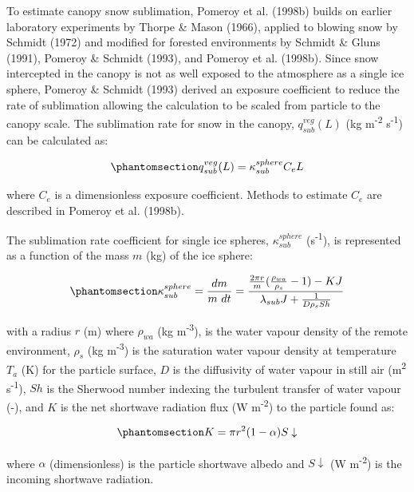\documentclass[
  letterpaper,
]{tex/uofsthesis-cs}
\begin{document}
To estimate canopy snow sublimation, Pomeroy et al. (1998b) builds on
earlier laboratory experiments by Thorpe \& Mason (1966), applied to
blowing snow by Schmidt (1972) and modified for forested environments by
Schmidt \& Gluns (1991), Pomeroy \& Schmidt (1993), and Pomeroy et al.
(1998b). Since snow intercepted in the canopy is not as well exposed to
the atmosphere as a single ice sphere, Pomeroy \& Schmidt (1993) derived
an exposure coefficient to reduce the rate of sublimation allowing the
calculation to be scaled from particle to the canopy scale. The
sublimation rate for snow in the canopy, \(q_{sub}^{veg}(L)\) (kg
m\textsuperscript{-2} s\textsuperscript{-1}) can be calculated as:

\begin{equation}\phantomsection\label{eq-pom98-v_i}{
q_{sub}^{veg}(L) = \kappa_{sub}^{sphere} C_e L
}\end{equation}

where \(C_e\) is a dimensionless exposure coefficient. Methods to
estimate \(C_e\) are described in Pomeroy et al. (1998b).

The sublimation rate coefficient for single ice spheres,
\(\kappa_{sub}^{sphere}\) (s\textsuperscript{-1}), is represented as a
function of the mass \(m\) (kg) of the ice sphere:

\begin{equation}\phantomsection\label{eq-pom98-sublimation}{
\kappa_{sub}^{sphere} = \frac{dm}{m \ dt} = \frac{
  \frac{2 \pi r}{m} (\frac{\rho_{wa}}{{\rho_s}}-1) - K J
}{
  \lambda_{sub} J + \frac{1}{D \rho_s Sh}
}
}\end{equation}

with a radius \(r\) (m) where \(\rho_{wa}\) (kg m\textsuperscript{-3}),
is the water vapour density of the remote environment, \(\rho_s\) (kg
m\textsuperscript{-3}) is the saturation water vapour density at
temperature \(T_a\) (K) for the particle surface, \(D\) is the
diffusivity of water vapour in still air (m\textsuperscript{2}
s\textsuperscript{-1}), \(Sh\) is the Sherwood number indexing the
turbulent transfer of water vapour (-), and \(K\) is the net shortwave
radiation flux (W m\textsuperscript{-2}) to the particle found as:

\begin{equation}\phantomsection\label{eq-pom98-sw}{
K = \pi r^2 (1-\alpha) S \downarrow
}\end{equation}

where \(\alpha\) (dimensionless) is the particle shortwave albedo and
\(S \downarrow\) (W m\textsuperscript{-2}) is the incoming shortwave
radiation.
\end{document}
